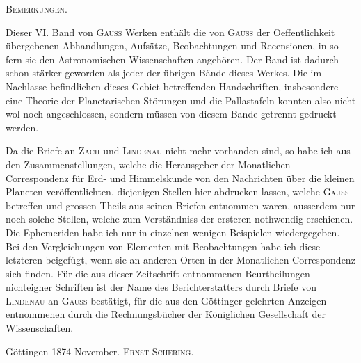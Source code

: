 \par\bigskip
\noindent\makebox[\linewidth][c]{\rule{.255\linewidth}{.35pt}}\par\medskip
\hypertarget{native-659-lower}{}
\begin{center}\textsc{Bemerkungen.}\end{center}

Dieser VI. Band von \textsc{Gauss} Werken enthält die von \textsc{Gauss} der Oeffentlichkeit übergebenen Abhandlungen, Aufsätze, Beobachtungen und Recensionen, in so fern sie den Astronomischen Wissenschaften angehören. Der Band ist dadurch schon stärker geworden als jeder der übrigen Bände dieses Werkes. Die im Nachlasse befindlichen dieses Gebiet betreffenden Handschriften, insbesondere eine Theorie der Planetarischen Störungen und die Pallastafeln konnten also nicht wol noch angeschlossen, sondern müssen von diesem Bande getrennt gedruckt werden.

Da die Briefe an \textsc{Zach} und \textsc{Lindenau} nicht mehr vorhanden sind, so habe ich aus den Zusammenstellungen, welche die Herausgeber der Monatlichen Correspondenz für Erd- und Himmelskunde von den Nachrichten über die kleinen Planeten veröffentlichten, diejenigen Stellen hier abdrucken lassen, welche \textsc{Gauss} betreffen und grossen Theils aus seinen Briefen entnommen waren, ausserdem nur noch solche Stellen, welche zum Verständniss der ersteren nothwendig erschienen. Die Ephemeriden habe ich nur in einzelnen wenigen Beispielen wiedergegeben. Bei den Vergleichungen von Elementen mit Beobachtungen habe ich diese letzteren beigefügt, wenn sie an anderen Orten in der Monatlichen Correspondenz sich finden. Für die aus dieser Zeitschrift entnommenen Beurtheilungen nichteigner Schriften ist der Name des Berichterstatters durch Briefe von \textsc{Lindenau} an \textsc{Gauss} bestätigt, für die aus den Göttinger gelehrten Anzeigen entnommenen durch die Rechnungsbücher der Königlichen Gesellschaft der Wissenschaften.

Göttingen 1874 November. \hfill \textsc{Ernst Schering}.\par\smallskip
\noindent\makebox[\linewidth][c]{\rule{.24\linewidth}{.35pt}}\par
\clearpage
\endgroup
